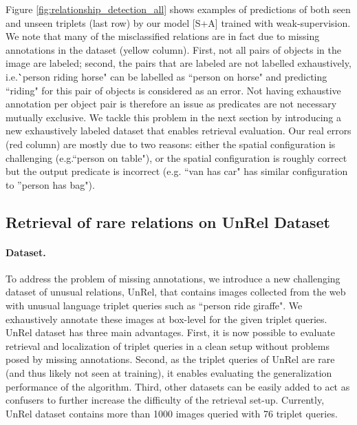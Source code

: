 \documentclass[10pt,twocolumn,letterpaper]{article}
\newcommand{\spaceparagraph}{\vspace{-.35cm}}
\newcommand{\gotoline}{\vspace{.05cm}}
\begin{document}
\gotoline
Figure \ref{fig:relationship_detection_all} shows examples of predictions  of both seen and unseen triplets (last row) by our model [S+A] trained with weak-supervision. We note that many of the misclassified relations are in fact due to missing annotations in the dataset (yellow column). First, not all pairs of objects in the image are labeled; second, the pairs that are labeled are not labelled exhaustively, i.e.\``person riding horse" can be labelled as ``person on horse" and predicting ``riding" for this pair of objects is considered as an error. Not having exhaustive annotation per object pair is therefore an issue as predicates are not necessary mutually exclusive. We tackle this problem in the next section by introducing a new exhaustively labeled dataset that enables retrieval evaluation. Our real errors (red column) are mostly due to two reasons: either the spatial configuration is challenging (e.g.``person on table"), or the spatial configuration is roughly correct  but the output predicate is incorrect (e.g. ``van has car" has similar configuration to ''person has bag"). 




\subsection{Retrieval of rare relations on UnRel Dataset}




\paragraph{Dataset.} To address the problem of missing annotations, we introduce a new challenging dataset of unusual relations, UnRel, that contains images collected from the web with unusual language triplet queries such as ``person ride giraffe". We exhaustively annotate these images at box-level for the given triplet queries. 
UnRel dataset has three main advantages. First, it is now possible to evaluate retrieval and localization of triplet queries in a clean setup without problems posed by missing annotations. Second, as the triplet queries of UnRel are rare (and thus likely not seen at training), it enables evaluating the generalization performance of the algorithm. Third, other datasets can be easily added to act as confusers to further increase the difficulty of the retrieval set-up. 
Currently, UnRel dataset contains more than 1000 images queried with 76 triplet queries.


\spaceparagraph
\end{document}
